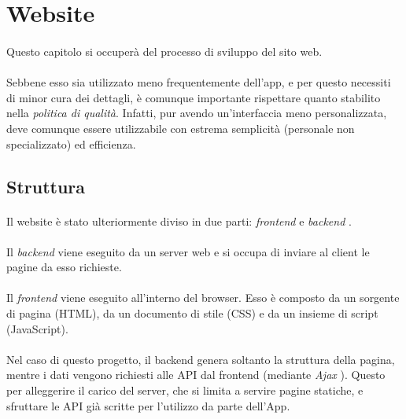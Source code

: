 \documentclass[11pt,a4paper,english]{article}
\begin{document}
\section{Website}

\paragraph{} Questo capitolo si occuperà del processo di sviluppo del sito web. 

\paragraph{} Sebbene esso sia utilizzato meno frequentemente dell'app, e per questo necessiti di minor cura dei dettagli, è comunque importante rispettare quanto stabilito nella \emph{politica di qualità}. Infatti, pur avendo un'interfaccia meno personalizzata, deve comunque essere utilizzabile con estrema semplicità (personale non specializzato) ed efficienza.

\subsection{Struttura}

\paragraph{} Il website è stato ulteriormente diviso in due parti: \emph{frontend} e \emph{backend} \cite{frontend_vs_backend}. 

\paragraph{} Il \emph{backend} viene eseguito da un server web e si occupa di inviare al client le pagine da esso richieste. 

\paragraph{} Il \emph{frontend} viene eseguito all'interno del browser. Esso è composto da un sorgente di pagina (HTML), da un documento di stile (CSS) e da un insieme di script (JavaScript). 

\paragraph{} Nel caso di questo progetto, il backend genera soltanto la struttura della pagina, mentre i dati vengono richiesti alle API dal frontend (mediante \emph{Ajax} \cite{ajax}). Questo per alleggerire il carico del server, che si limita a servire pagine statiche, e sfruttare le API già scritte per l'utilizzo da parte dell'App. 
\end{document}
